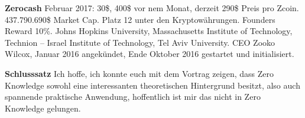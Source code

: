 \documentclass[12pt,a4paper,bibliography=totocnumbered,listof=totocnumbered]{scrartcl}
\begin{document}
\textbf{Zerocash} Februar 2017: 30\$, 400\$ vor nem Monat, derzeit 290\$ Preis pro Zcoin. 437.790.690\$ Market Cap. Platz 12 unter den Kryptowährungen. Founders Reward 10\%. Johns Hopkins University, Massachusetts Institute of Technology, Technion – Israel Institute of Technology, Tel Aviv University. CEO Zooko Wilcox, Januar 2016 angekündet, Ende Oktober 2016 gestartet und initialisiert.

\vspace{3mm}

\textbf{Schlusssatz} Ich hoffe, ich konnte euch mit dem Vortrag zeigen, dass Zero Knowledge sowohl eine interessanten theoretischen Hintergrund besitzt, also auch spannende praktische Anwendung, hoffentlich ist mir das nicht in Zero Knowledge gelungen.
\end{document}
